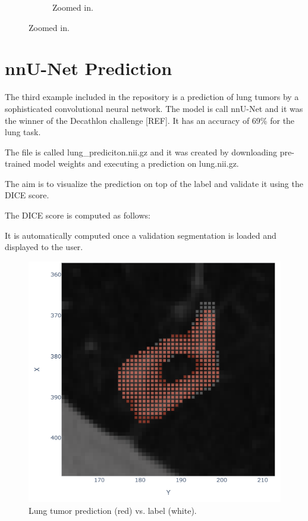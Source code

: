 \begin{figure}[h]
\begin{subfigure}[t]{0.45\linewidth}
		\caption{Zoomed in.}
	\end{subfigure}
\end{figure}

\section{nnU-Net Prediction}
The third example included in the repository is a prediction of lung tumors by a sophisticated convolutional neural network. The model is call nnU-Net and it was the winner of the Decathlon challenge [REF]. It has an accuracy of 69\% for the lung task.

The file is called lung\_prediciton.nii.gz and it was created by downloading pre-trained model weights and executing a prediction on lung.nii.gz.

The aim is to visualize the prediction on top of the label and validate it using the DICE score.

The DICE score is computed as follows:

It is automatically computed once a validation segmentation is loaded and displayed to the user. 

\begin{figure}[h]
	\centering
	\includegraphics[width=.5\linewidth]{figures/lung_prediction.png}
	\caption{Lung tumor prediction (red) vs. label (white).}
\end{figure}